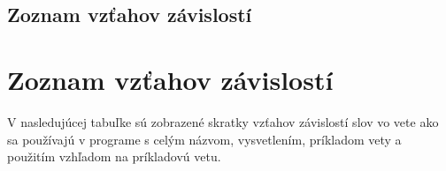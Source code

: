 
\newpage
{}
{
	\section{Zoznam vzťahov závislostí}
}
{
	\chapter{Zoznam vzťahov závislostí}
}
V nasledujúcej tabuľke sú zobrazené skratky vzťahov závislostí slov vo vete ako sa používajú v programe s celým názvom, vysvetlením, príkladom vety a použitím vzhľadom na príkladovú vetu.

